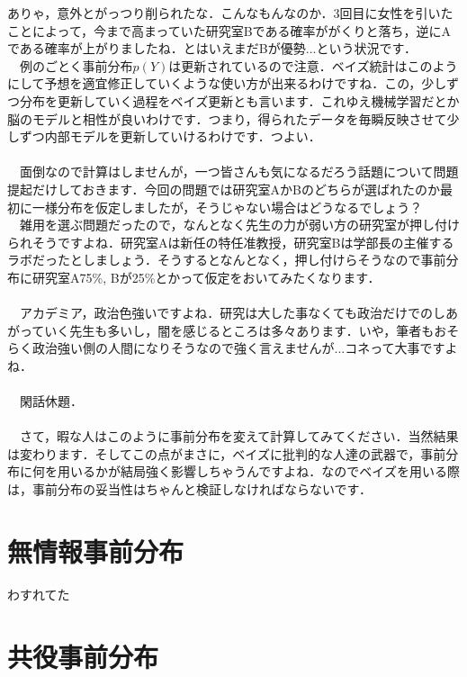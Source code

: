 \documentclass[11pt,a4paper]{ujreport} 	%
\begin{document}
ありゃ，意外とがっつり削られたな．こんなもんなのか．3回目に女性を引いたことによって，今まで高まっていた研究室Bである確率ががくりと落ち，逆にAである確率が上がりましたね．とはいえまだBが優勢...という状況です．\\
　例のごとく事前分布$p(Y)$は更新されているので注意．ベイズ統計はこのようにして予想を適宜修正していくような使い方が出来るわけですね．この，少しずつ分布を更新していく過程をベイズ更新とも言います．これゆえ機械学習だとか脳のモデルと相性が良いわけです．つまり，得られたデータを毎瞬反映させて少しずつ内部モデルを更新していけるわけです．つよい．\\
\\
　面倒なので計算はしませんが，一つ皆さんも気になるだろう話題について問題提起だけしておきます．今回の問題では研究室AかBのどちらが選ばれたのか最初に一様分布を仮定しましたが，そうじゃない場合はどうなるでしょう？\\
　雑用を選ぶ問題だったので，なんとなく先生の力が弱い方の研究室が押し付けられそうですよね．研究室Aは新任の特任准教授，研究室Bは学部長の主催するラボだったとしましょう．そうするとなんとなく，押し付けらそうなので事前分布に研究室A75\%, Bが25\%とかって仮定をおいてみたくなります．\\
\\
　アカデミア，政治色強いですよね．研究は大した事なくても政治だけでのしあがっていく先生も多いし，闇を感じるところは多々あります．いや，筆者もおそらく政治強い側の人間になりそうなので強く言えませんが...コネって大事ですよね．\\
\\
　閑話休題．
\\
\\
　さて，暇な人はこのように事前分布を変えて計算してみてください．当然結果は変わります．そしてこの点がまさに，ベイズに批判的な人達の武器で，事前分布に何を用いるかが結局強く影響しちゃうんですよね．なのでベイズを用いる際は，事前分布の妥当性はちゃんと検証しなければならないです．











\section{無情報事前分布}





わすれてた

\section{共役事前分布}
\end{document}
